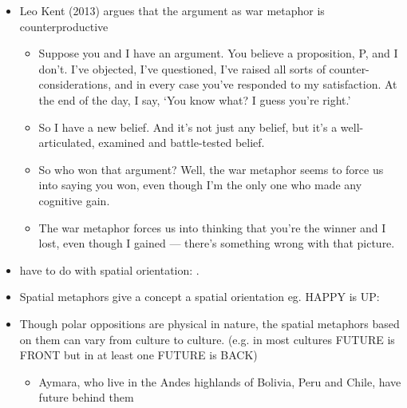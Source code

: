 \documentclass[a4paper,landscape,headrule,footrule,xetex]{foils}
\begin{document}
\begin{itemize}
\item Leo Kent (2013) argues that the argument as war metaphor is counterproductive
  \begin{itemize}
  \item Suppose you and I have an argument. You believe a proposition, P, and I don't. I've objected, I've questioned, I've raised all sorts of counter-considerations, and in every case you've responded to my satisfaction. At the end of the day, I say, ‘You know what? I guess you're right.'
  \item So I have a new belief. And it's not just any belief, but it's a well-articulated, examined and battle-tested belief.
  \item So who won that argument? Well, the war metaphor seems to force us into saying you won, even though I'm the only one who made any cognitive gain.
  \item The war metaphor forces us into thinking that you're the winner and I lost, even though I gained ---  there's something wrong with that picture.
  \end{itemize}
  
\end{itemize}



\begin{itemize}
\item {} have to do with
spatial orientation: .

\item Spatial metaphors give a concept a spatial orientation eg.
HAPPY is UP: 
\item Though polar oppositions  are physical in nature, the spatial
metaphors based on them can vary from culture to culture. (e.g. in most 
cultures FUTURE is FRONT but in at least one FUTURE is BACK)
\begin{itemize}
\item Aymara, who live in the Andes highlands of Bolivia, Peru and
  Chile, have future behind them
\end{itemize}
\end{itemize}

\begin{exe}
\ex {}
\ex {}
\ex {}
\ex {}
\ex {}
\ex {}
\ex {}
\ex {}
\ex {}
\ex {}
\end{exe}
\end{document}
